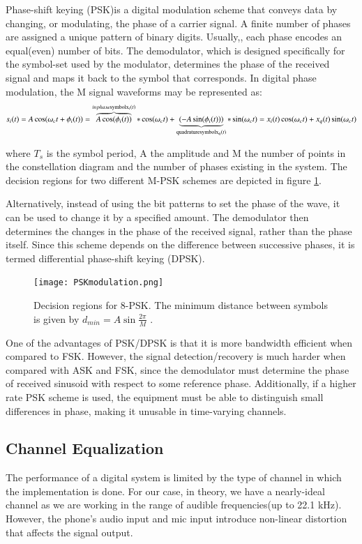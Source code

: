 \documentclass[12pt,a4paper,openright]{article}
\begin{document}
Phase-shift keying (PSK)is a digital modulation scheme that conveys data by changing, or modulating, the phase of a carrier signal. A finite number of phases are assigned a unique pattern of binary digits. Usually,, each phase encodes an equal(even) number of bits. The demodulator, which is designed specifically for the symbol-set used by the modulator, determines the phase of the received signal and maps it back to the symbol that corresponds. In digital phase modulation, the M signal waveforms may be represented as: 
\[{s_i}(t) = A\cos ({\omega _c}t + {\phi _i}(t)) = \overbrace {A\cos ({\phi _i}(t))}^{inphase{\rm{ symbol }}{{\rm{x}}_i}(t)}*\cos ({\omega _c}t) + \underbrace {( - A\sin ({\phi _i}(t)))}_{{\rm{quadrature symbol }}{{\rm{x}}_q}(t)}*\sin ({\omega _c}t) = {x_i}(t)\cos ({\omega _c}t) + {x_q}(t)\sin ({\omega _c}t)\]

where $T_s$ is the symbol period, A the amplitude and M the number of points in the constellation diagram and the number of phases existing in the system. The decision regions for two different M-PSK schemes are depicted in figure \ref{fig:pskdr}.

 Alternatively, instead of using the bit patterns to set the phase of the wave, it can be used to change it by a specified amount. The demodulator then determines the changes in the phase of the received signal, rather than the phase itself. Since this scheme depends on the difference between successive phases, it is termed differential phase-shift keying (DPSK). 
 \begin{figure}[h]
  \centering
    \texttt{[image: PSKmodulation.png]}
    \caption{Decision regions for 8-PSK. The minimum distance between symbols is given by $d_{min}=A\sin\frac{2\pi}{M}$ \cite{XiongDigModTech}.}
    \label{fig:pskdr}
\end{figure}

One of the advantages of PSK/DPSK is that it is more bandwidth efficient when compared to FSK. However, the signal detection/recovery is much harder when compared with ASK and FSK, since the demodulator must determine the phase of received sinusoid with respect to some reference phase. Additionally, if a higher rate PSK scheme is used, the equipment must be able to distinguish small differences in phase, making it unusable in time-varying channels. 



\subsection{Channel Equalization}
The performance of a digital system is limited by the type of channel in which the implementation is done. For our case, in theory, we have a nearly-ideal channel as we are working in the range of audible frequencies(up to 22.1 kHz). However, the phone's audio input and mic input introduce non-linear distortion that affects the signal output.
\end{document}
